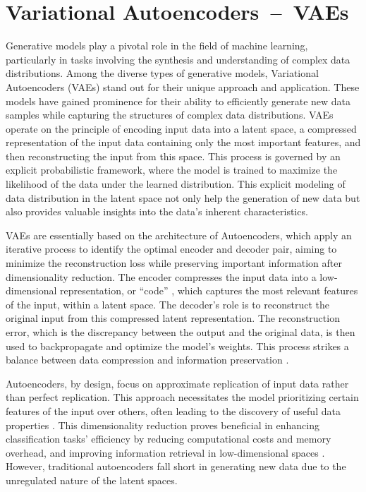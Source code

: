 \section{Variational Autoencoders~--~VAEs}\label{VAEs}

Generative models play a pivotal role in the field of machine learning, particularly in tasks involving the synthesis and understanding of complex data distributions. Among the diverse types of generative models, Variational Autoencoders (VAEs) stand out for their unique approach and application. These models have gained prominence for their ability to efficiently generate new data samples while capturing the structures of complex data distributions. VAEs operate on the principle of encoding input data into a latent space, a compressed representation of the input data containing only the most important features, and then reconstructing the input from this space. This process is governed by an explicit probabilistic framework, where the model is trained to maximize the likelihood of the data under the learned distribution. This explicit modeling of data distribution in the latent space not only help the generation of new data but also provides valuable insights into the data's inherent characteristics. 

VAEs are essentially based on the architecture of Autoencoders, which apply an iterative process to identify the optimal encoder and decoder pair, aiming to minimize the reconstruction loss while preserving important information after dimensionality reduction. The encoder compresses the input data into a low-dimensional representation, or ``code'' \citep{hintonCode, GoodfellowDeepLearning}, which captures the most relevant features of the input, within a latent space. The decoder's role is to reconstruct the original input from this compressed latent representation. The reconstruction error, which is the discrepancy between the output and the original data, is then used to backpropagate and optimize the model's weights. This process strikes a balance between data compression and information preservation \citep{hintonCode, GoodfellowDeepLearning, michelucci2022introduction}.

Autoencoders, by design, focus on approximate replication of input data rather than perfect replication. This approach necessitates the model prioritizing certain features of the input over others, often leading to the discovery of useful data properties \citep{GoodfellowDeepLearning}. This dimensionality reduction proves beneficial in enhancing classification tasks' efficiency by reducing computational costs and memory overhead, and improving information retrieval in low-dimensional spaces \citep{GoodfellowDeepLearning}. However, traditional autoencoders fall short in generating new data due to the unregulated nature of the latent spaces.


